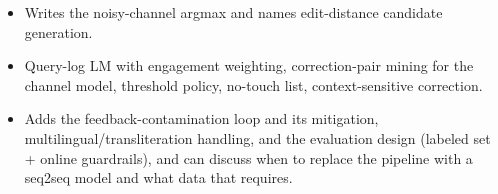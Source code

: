 \begin{interviewq}

\goodgreat
\begin{itemize}
    \item {} Writes the noisy-channel argmax and names edit-distance candidate generation.
    \item {} Query-log LM with engagement weighting, correction-pair mining for the channel model, threshold policy, no-touch list, context-sensitive correction.
    \item {} Adds the feedback-contamination loop and its mitigation, multilingual/transliteration handling, and the evaluation design (labeled set + online guardrails), and can discuss when to replace the pipeline with a seq2seq model and what data that requires.
\end{itemize}

\end{interviewq}


